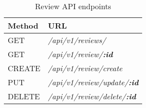 \begin{table}[!h]
    \centering
    \caption{Review API endpoints}
    \label{tab:review-api}
    \begin{tabular}{|l|p{29em}|}
        \hline
        \textbf{Method} & \textbf{URL} \\
        \hline
        GET & \textit{/api/v1/reviews/} \\
        \hline
        GET & \textit{/api/v1/review/\textbf{:id}} \\
        \hline
        CREATE & \textit{/api/v1/review/create} \\
        \hline
        PUT & \textit{/api/v1/review/update/\textbf{:id}} \\
        \hline
        DELETE & \textit{/api/v1/review/delete/\textbf{:id}} \\
        \hline
    \end{tabular}
\end{table}
